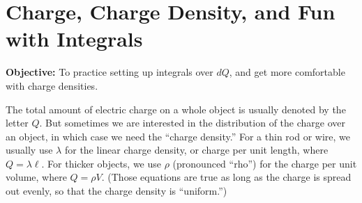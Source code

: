 \section{Charge, Charge Density, and Fun with Integrals}

\makelabheader %

\vspace{0.1in}
\textbf{Objective:} To practice setting up integrals over $dQ$, and get more comfortable with charge densities.

\vspace{0.1in}
The total amount of electric charge on a whole object is usually denoted by the letter $Q$. But sometimes we are interested in the distribution of the charge over an object, in which case we need the ``charge density.''  For a thin rod or wire, we usually use $\lambda$ for the linear charge density, or charge per unit length, where $Q = \lambda \ell$. For thicker objects, we use $\rho$ (pronounced ``rho'') for the charge per unit volume, where $Q = \rho V$.  (Those equations are true as long as the charge is spread out evenly, so that the charge density is ``uniform.'')

